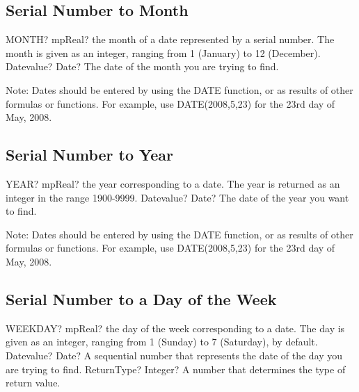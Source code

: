 \subsection{Serial Number to Month}

\begin{mpFunctionsExtract}
	\mpWorksheetFunctionOneNotImplemented
	{MONTH? mpReal? the month of a date represented by a serial number. The month is given as an integer, ranging from 1 (January) to 12 (December).}
	{Datevalue? Date? The date of the month you are trying to find.}
\end{mpFunctionsExtract}

\vspace{0.3cm}
Note: Dates should be entered by using the DATE function, or as results of other formulas or functions. For example, use DATE(2008,5,23) for the 23rd day of May, 2008.



\subsection{Serial Number to Year}

\begin{mpFunctionsExtract}
	\mpWorksheetFunctionOneNotImplemented
	{YEAR? mpReal? the year corresponding to a date. The year is returned as an integer in the range 1900-9999.}
	{Datevalue? Date? The date of the year you want to find.}
\end{mpFunctionsExtract}

\vspace{0.3cm}
Note: Dates should be entered by using the DATE function, or as results of other formulas or functions. For example, use DATE(2008,5,23) for the 23rd day of May, 2008.




\subsection{Serial Number to a Day of the Week}

\begin{mpFunctionsExtract}
	\mpWorksheetFunctionTwoNotImplemented
	{WEEKDAY? mpReal? the day of the week corresponding to a date. The day is given as an integer, ranging from 1 (Sunday) to 7 (Saturday), by default.}
	{Datevalue? Date? A sequential number that represents the date of the day you are trying to find.}
	{ReturnType? Integer? A number that determines the type of return value.}
\end{mpFunctionsExtract}

